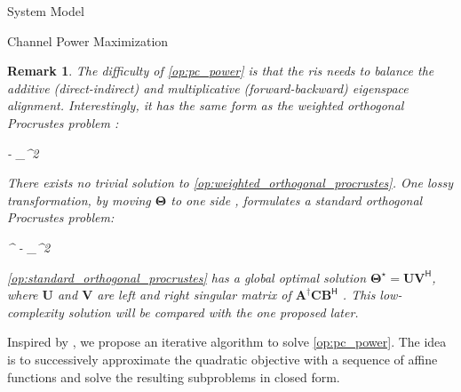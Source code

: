 \documentclass[journal]{IEEEtran}
\newtheorem{remark}{Remark}
\begin{document}
\begin{section}{System Model}
\begin{subsection}{Channel Power Maximization}
		\begin{remark}
			The difficulty of \eqref{op:pc_power} is that the \gls{ris} needs to balance the additive (direct-indirect) and multiplicative (forward-backward) eigenspace alignment.
			Interestingly, it has the same form as the \emph{weighted orthogonal Procrustes problem} \cite{Gower2004}:
			\begin{mini!}
				{\scriptstyle{\mathbf{\Theta}}}{\lVert {} -  \rVert _^2}{\label{op:weighted_orthogonal_procrustes}}{}
			\end{mini!}
			There exists no trivial solution to \eqref{op:weighted_orthogonal_procrustes}.
			One lossy transformation, by moving $\mathbf{\Theta}$ to one side \cite{Bell2003}, formulates a standard orthogonal Procrustes problem:
			\begin{mini!}
				{\scriptstyle{\mathbf{\Theta}}}{\lVert {}^\dagger {} -  \rVert _^2}{\label{op:standard_orthogonal_procrustes}}{}
				\addConstraint{\mathbf{\Theta}^\mathsf{H} \mathbf{\Theta}=\mathbf{I}.}{}{}
			\end{mini!}
			\eqref{op:standard_orthogonal_procrustes} has a global optimal solution $\mathbf{\Theta}^\star = \mathbf{U} \mathbf{V}^\mathsf{H}$, where $\mathbf{U}$ and $\mathbf{V}$ are left and right singular matrix of $\mathbf{\mathbf{A}^\dagger \mathbf{C} \mathbf{B}^\mathsf{H}}$ \cite{Golub2013}.
			This low-complexity solution will be compared with the one proposed later.
		\end{remark}

		Inspired by \cite{Nie2017}, we propose an iterative algorithm to solve \eqref{op:pc_power}.
		The idea is to successively approximate the quadratic objective with a sequence of affine functions and solve the resulting subproblems in closed form.


\end{subsection}
\end{section}
\end{document}
